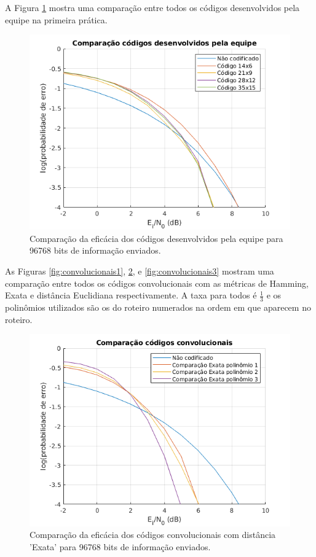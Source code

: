 A Figura \ref{fig:proprios} mostra uma comparação entre todos os códigos desenvolvidos pela equipe na primeira prática.

\begin{figure}[ht]
	\centering
	\captionsetup{justification=centering}
	\includegraphics[scale=0.45]{floats/proprios.png}
	\caption{\label{fig:proprios}Comparação da eficácia dos códigos desenvolvidos pela equipe para 96768 bits de informação enviados.}
\end{figure}

As Figuras \ref{fig:convolucionais1}, \ref{fig:convolucionais2}, e \ref{fig:convolucionais3} mostram uma comparação entre todos os códigos convolucionais com as métricas de Hamming, Exata e distância Euclidiana respectivamente. A taxa para todos é $\frac{1}{3}$ e os polinômios utilizados são os do roteiro numerados na ordem em que aparecem no roteiro.

\begin{figure}[ht]
	\centering
	\captionsetup{justification=centering}
	\includegraphics[scale=0.45]{floats/conv2.png}
	\caption{\label{fig:convolucionais2}Comparação da eficácia dos códigos convolucionais com distância 'Exata' para 96768 bits de informação enviados.}
\end{figure}


